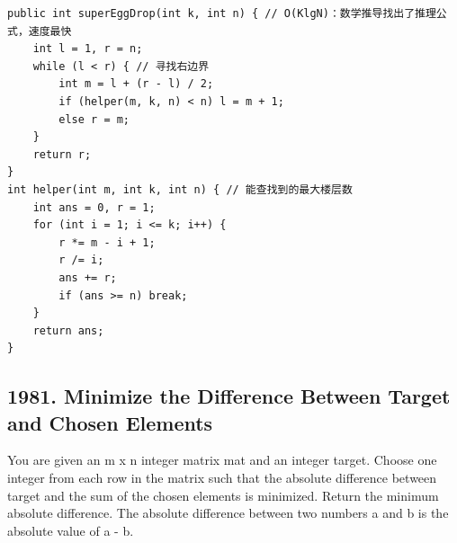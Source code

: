 \documentclass[9pt, b5paaper]{book}
\begin{document}
\begin{enumerate}
\begin{verbatim}
public int superEggDrop(int k, int n) { // O(KlgN)：数学推导找出了推理公式，速度最快
    int l = 1, r = n;
    while (l < r) { // 寻找右边界
        int m = l + (r - l) / 2;
        if (helper(m, k, n) < n) l = m + 1;
        else r = m;
    }
    return r;
}
int helper(int m, int k, int n) { // 能查找到的最大楼层数
    int ans = 0, r = 1;
    for (int i = 1; i <= k; i++) {
        r *= m - i + 1;
        r /= i;
        ans += r;
        if (ans >= n) break;
    }
    return ans;
}
\end{verbatim}
\end{enumerate}

\subsection{1981. Minimize the Difference Between Target and Chosen Elements}
\label{sec-1-4-50}
You are given an m x n integer matrix mat and an integer target.
Choose one integer from each row in the matrix such that the absolute difference between target and the sum of the chosen elements is minimized.
Return the minimum absolute difference.
The absolute difference between two numbers a and b is the absolute value of a - b.
\end{document}
